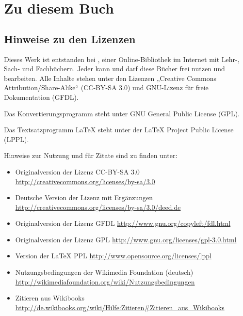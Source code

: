 \chapter{Zu diesem Buch}
\section{Hinweise zu den Lizenzen}
\label{Lizenzhinweise}

Dieses Werk ist entstanden bei , einer Online-Bibliothek im Internet mit Lehr-, Sach- und Fachbüchern. Jeder kann und darf diese Bücher frei nutzen und bearbeiten. Alle Inhalte stehen unter den Lizenzen „Creative Commons Attribution/Share-Alike“ (CC-BY-SA 3.0) und GNU-Lizenz für freie Dokumentation (GFDL). 

Das Konvertierungsprogramm  steht unter GNU General Public License (GPL).

Das Textsatzprogramm  {\LaTeX{}} steht unter der LaTeX Project Public License (LPPL).

Hinweise zur Nutzung und für Zitate sind zu finden unter:
\begin{itemize}
\item Originalversion der Lizenz CC-BY-SA 3.0 \newline \url{http://creativecommons.org/licenses/by-sa/3.0}
\item Deutsche Version der Lizenz mit Ergänzungen \newline{} \url{http://creativecommons.org/licenses/by-sa/3.0/deed.de}
\item Originalversion der Lizenz GFDL \newline{} \url{http://www.gnu.org/copyleft/fdl.html}
\item Originalversion der Lizenz GPL \newline{} \url{http://www.gnu.org/licenses/gpl-3.0.html}
\item Version der LaTeX PPL \newline{} \url{http://www.opensource.org/licenses/lppl}
\item Nutzungsbedingungen der Wikimedia Foundation (deutsch) \newline{} \url{http://wikimediafoundation.org/wiki/Nutzungsbedingungen}
\item Zitieren aus Wikibooks \newline{} \url{http://de.wikibooks.org/wiki/Hilfe:Zitieren#Zitieren_aus_Wikibooks}
\end{itemize}

